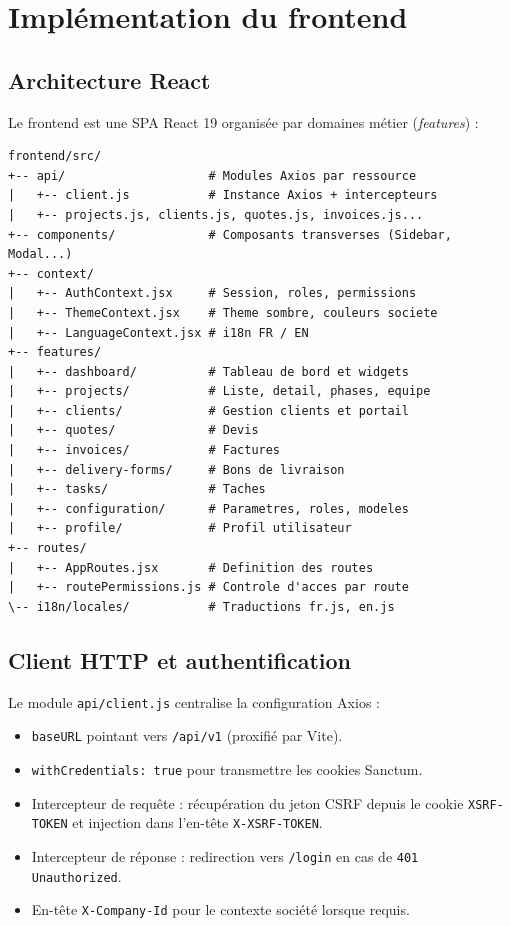 \section{Implémentation du frontend}

\subsection{Architecture React}

Le frontend est une SPA React 19 organisée par domaines métier (\textit{features}) :

\begin{verbatim}
frontend/src/
+-- api/                    # Modules Axios par ressource
|   +-- client.js           # Instance Axios + intercepteurs
|   +-- projects.js, clients.js, quotes.js, invoices.js...
+-- components/             # Composants transverses (Sidebar, Modal...)
+-- context/
|   +-- AuthContext.jsx     # Session, roles, permissions
|   +-- ThemeContext.jsx    # Theme sombre, couleurs societe
|   +-- LanguageContext.jsx # i18n FR / EN
+-- features/
|   +-- dashboard/          # Tableau de bord et widgets
|   +-- projects/           # Liste, detail, phases, equipe
|   +-- clients/            # Gestion clients et portail
|   +-- quotes/             # Devis
|   +-- invoices/           # Factures
|   +-- delivery-forms/     # Bons de livraison
|   +-- tasks/              # Taches
|   +-- configuration/      # Parametres, roles, modeles
|   +-- profile/            # Profil utilisateur
+-- routes/
|   +-- AppRoutes.jsx       # Definition des routes
|   +-- routePermissions.js # Controle d'acces par route
\-- i18n/locales/           # Traductions fr.js, en.js
\end{verbatim}

\subsection{Client HTTP et authentification}

Le module \texttt{api/client.js} centralise la configuration Axios :

\begin{itemize}
  \item \texttt{baseURL} pointant vers \texttt{/api/v1} (proxifié par Vite).
  \item \texttt{withCredentials: true} pour transmettre les cookies Sanctum.
  \item Intercepteur de requête : récupération du jeton CSRF depuis le cookie
  \texttt{XSRF-TOKEN} et injection dans l'en-tête \texttt{X-XSRF-TOKEN}.
  \item Intercepteur de réponse : redirection vers \texttt{/login} en cas de
  \texttt{401 Unauthorized}.
  \item En-tête \texttt{X-Company-Id} pour le contexte société lorsque requis.
\end{itemize}

